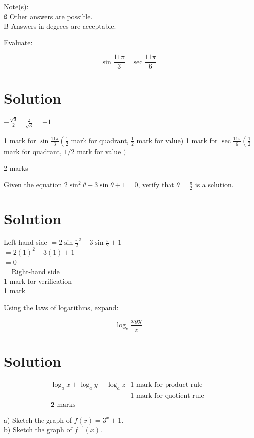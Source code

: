 \documentclass[10pt]{article}
\begin{document}
Note(s):\\
ß Other answers are possible.\\
B Answers in degrees are acceptable.

Evaluate:

$$
\sin \frac{11 \pi}{3} \quad \sec \frac{11 \pi}{6}
$$

\section*{Solution}
$-\frac{\sqrt{3}}{2} \quad \frac{2}{\sqrt{3}}=-1$

1 mark for $\sin \frac{11 \pi}{3}\left(\frac{1}{2}\right.$ mark for quadrant, $\frac{1}{2}$ mark for value) 1 mark for $\sec \frac{11 \pi}{6}\left(\frac{1}{2}\right.$ mark for quadrant, $1 / 2$ mark for value $)$

2 marks

Given the equation $2 \sin ^{2} \theta-3 \sin \theta+1=0$, verify that $\theta=\frac{\pi}{2}$ is a solution.

\section*{Solution}
Left-hand side $=2 \sin \frac{\pi}{2}^{2}-3 \sin \frac{\pi}{2}+1$\\
$=2(1)^{2}-3(1)+1$\\
$=0$\\
= Right-hand side\\
1 mark for verification\\
1 mark

Using the laws of logarithms, expand:

$$
\log _{a} \frac{x g y}{z}
$$

\section*{Solution}
$$
\begin{array}{ll}
\log _{a} x+\log _{a} y-\log _{a} z & 1 \text { mark for product rule } \\
& 1 \text { mark for quotient rule } \\
\mathbf{2} \text { marks }
\end{array}
$$

a) Sketch the graph of $f(x)=3^{x}+1$.\\
b) Sketch the graph of $f^{-1}(x)$.
\end{document}
